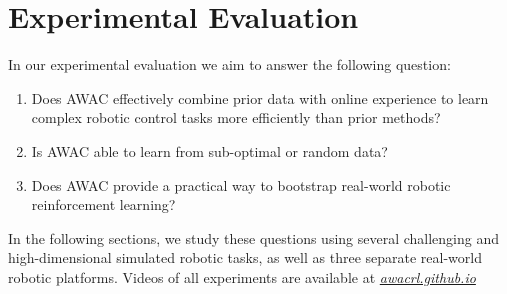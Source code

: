 \documentclass[conference]{IEEEtran}
\newcommand\projectpage{\href{https://awacrl.github.io/}{\textit{awacrl.github.io}}}
\begin{document}
\section{Experimental Evaluation}\label{sec:experiments}
In our experimental evaluation we aim to answer the following question: 

\begin{enumerate}
    \item Does AWAC effectively combine prior data with online experience to learn complex robotic control tasks more efficiently than prior methods?
    \item Is AWAC able to learn from sub-optimal or random data?
    \item Does AWAC provide a practical way to bootstrap real-world robotic reinforcement learning?
\end{enumerate}
\noindent In the following sections, we study these questions using several challenging and high-dimensional simulated robotic tasks, as well as three separate real-world robotic platforms.
Videos of all experiments are available at \projectpage
\end{document}
